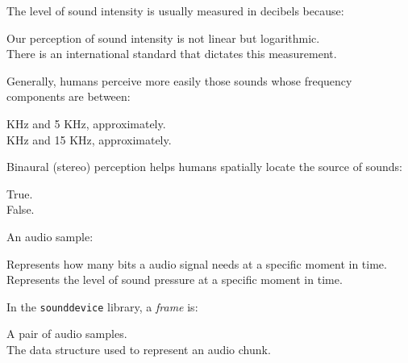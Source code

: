 \documentclass[legalpaper, 12pt, addpoints]{exam}
\begin{document}
\begin{questions}
\vspace{0.10in}

\question The level of sound intensity is usually measured in decibels because:

\begin{oneparchoices}
  \choice Our perception of sound intensity is not linear but logarithmic.\\
  \choice There is an international standard that dictates this measurement.
\end{oneparchoices}

\vspace{0.10in}

\question Generally, humans perceive more easily those sounds whose frequency components are between:

\begin{oneparchoices}
   KHz and 5 KHz, approximately.\\
   KHz and 15 KHz, approximately.
\end{oneparchoices}
  
\vspace{0.10in}

\question Binaural (stereo) perception helps humans spatially locate the source of sounds:

\begin{oneparchoices}
  \choice True.\\
  \choice False.
\end{oneparchoices}
  
\vspace{0.10in}

\question An audio sample:

\begin{oneparchoices}
  \choice Represents how many bits a audio signal needs at a specific moment in time.\\
  \choice Represents the level of sound pressure at a specific moment in time.
\end{oneparchoices}
  
\vspace{0.10in}

\question In the \texttt{sounddevice} library, a \emph{frame} is:

\begin{oneparchoices}
  \choice A pair of audio samples.\\
  \choice The data structure used to represent an audio chunk.
\end{oneparchoices}


\end{questions}
\end{document}
